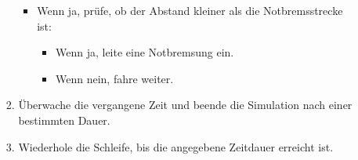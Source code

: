 \begin{enumerate}
\begin{itemize}
\begin{enumerate}
			\begin{itemize}
				\item Wenn ja, prüfe, ob der Abstand kleiner als die Notbremsstrecke ist:
				\begin{itemize}
					\item Wenn ja, leite eine Notbremsung ein.
					\item Wenn nein, fahre weiter.
				\end{itemize}
			\end{itemize}
			\item Überwache die vergangene Zeit und beende die Simulation nach einer bestimmten Dauer.
			\item Wiederhole die Schleife, bis die angegebene Zeitdauer erreicht ist.
		\end{enumerate}
	\end{itemize}
\end{enumerate}
